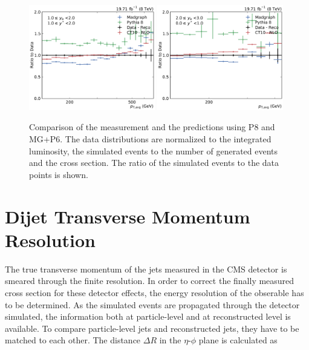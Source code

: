 \begin{figure}[htbp]
    \includegraphics[width=0.49\textwidth]{figures/measurement/ratio_reco_to_data_yb1ys1.pdf}\hfill
    \includegraphics[width=0.49\textwidth]{figures/measurement/ratio_reco_to_data_yb2ys0.pdf}
    \caption[Comparison of data with simulated events]{Comparison of the measurement and the predictions using P8 and MG+P6. The data distributions are normalized
    to the integrated luminosity, the simulated events to the number of generated events and the cross section. The ratio of the simulated
    events to the data points is shown.}
    \label{fig:ratio_recotodata}
\end{figure}


\section{Dijet Transverse Momentum  Resolution}
\label{sec:resolution}

The true transverse momentum of the jets measured in the CMS detector is smeared through the finite
resolution. In order to correct the finally measured cross section for these
detector effects, the energy resolution of the obserable has to be determined.
As the simulated events are propagated through the detector simulated, the
information both at particle-level and at reconstructed level is available. To
compare particle-level jets and reconstructed jets, they have to be matched to
each other. The distance $\Delta R$ in the $\eta$-$\phi$ plane is calculated as


